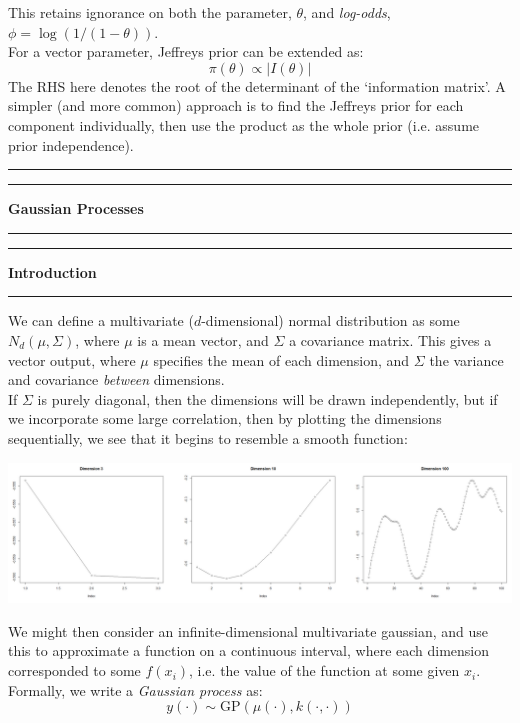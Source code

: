 \documentclass[12pt]{article}
\newcommand{\minisection}[1]{
    \par\vspace{0.25cm}
    \textbf{#1}\par
    \vspace{0.1cm}
    \hrule
    \vspace{0.25cm}
}
\newcommand{\doubleline}{
    \hrule
    \vspace*{0.05cm}
    \hrule
    \vspace*{0.25cm}
}
\begin{document}
    This retains ignorance on both the parameter, $\theta$, and \textit{log-odds}, $\phi = \log(1/(1-\theta))$.\\
    For a vector parameter, Jeffreys prior can be extended as:
    \begin{equation*}
        \pi(\theta) \propto \left| I(\theta)\right|
    \end{equation*}
    The RHS here denotes the root of the determinant of the `information matrix'. A simpler (and more common) approach is to find the Jeffreys prior for each component individually, then use the product as the whole prior (i.e. assume prior independence).
    \vspace*{0.5cm}
    \doubleline
    \begin{center}
        \huge \textbf{Gaussian Processes} \label{Gaussian Processes}
    \end{center}
    \doubleline
    \minisection{Introduction}
    We can define a multivariate ($d$-dimensional) normal distribution as some $N_d(\mu,\Sigma)$, where $\mu$ is a mean vector, and $\Sigma$ a covariance matrix. This gives a vector output, where $\mu$ specifies the mean of each dimension, and $\Sigma$ the variance and covariance \textit{between} dimensions.\\
    If $\Sigma$ is purely diagonal, then the dimensions will be drawn independently, but if we incorporate some large correlation, then by plotting the dimensions sequentially, we see that it begins to resemble a smooth function:
    \begin{center}
        \includegraphics[width=15cm]{ex_gausses.png}
    \end{center}
    We might then consider an infinite-dimensional multivariate gaussian, and use this to approximate a function on a continuous interval, where each dimension corresponded to some $f(x_i)$, i.e. the value of the function at some given $x_i$.\\
    Formally, we write a \textit{Gaussian process} as:
    \begin{equation*}
        y(\cdot) \sim \text{GP}(\mu(\cdot),k(\cdot,\cdot))
    \end{equation*}
\end{document}

